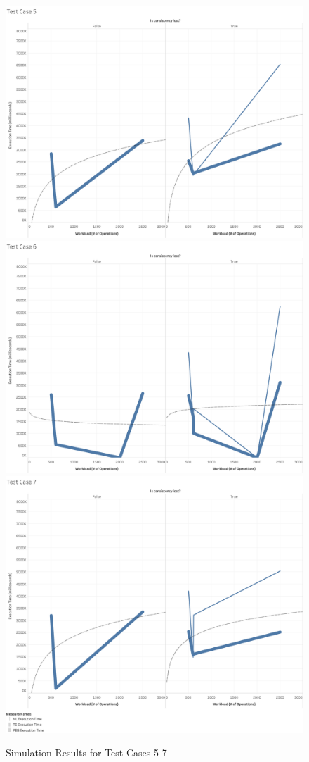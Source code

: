\begin{figure}
\centering
\includegraphics[scale=0.11]{images/TestCase5(WL).png}
\includegraphics[scale=0.11]{images/TestCase6(WL).png}
\includegraphics[scale=0.11]{images/TestCase7(WL).png}
\caption{Simulation Results for Test Cases 5-7}
\label{results:test_case_graphs_5_7}
\end{figure}

